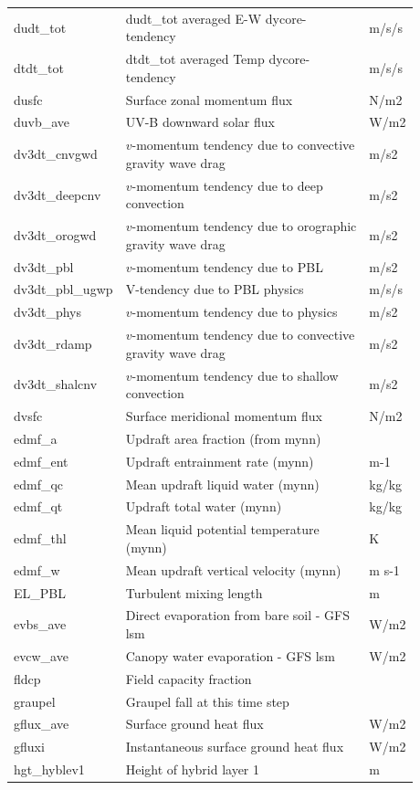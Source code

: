 \documentclass[11pt,fleqn]{report}              %
\begin{document}
\begin{enumerate}
\begin{enumerate}
{\begin{longtable}{p{0.17\linewidth} | p{0.6\linewidth} | p{0.11\linewidth} }
dudt\_tot & dudt\_tot averaged E-W dycore-tendency & m/s/s \\
dtdt\_tot & dtdt\_tot averaged Temp dycore-tendency & m/s/s \\ 
dusfc  & Surface zonal momentum flux & N/m2 \\
duvb\_ave  & UV-B downward solar flux & W/m2  \\
dv3dt\_cnvgwd & $v$-momentum tendency due to convective gravity wave drag & m/s2 \\
dv3dt\_deepcnv & $v$-momentum tendency due to deep convection & m/s2 \\
dv3dt\_orogwd & $v$-momentum tendency due to orographic gravity wave drag & m/s2 \\
dv3dt\_pbl & $v$-momentum tendency due to PBL & m/s2 \\
dv3dt\_pbl\_ugwp & V-tendency due to PBL physics & m/s/s \\
dv3dt\_phys & $v$-momentum tendency due to physics & m/s2 \\
dv3dt\_rdamp & $v$-momentum tendency due to convective gravity wave drag & m/s2 \\
dv3dt\_shalcnv & $v$-momentum tendency due to shallow convection & m/s2 \\
dvsfc  & Surface meridional momentum flux & N/m2  \\
edmf\_a & Updraft area fraction (from mynn) & \\
edmf\_ent & Updraft entrainment rate (mynn) & m-1 \\
edmf\_qc & Mean updraft liquid water (mynn) & kg/kg \\
edmf\_qt & Updraft total water (mynn) & kg/kg \\
edmf\_thl & Mean liquid potential temperature (mynn) & K \\
edmf\_w & Mean updraft vertical velocity (mynn) & m s-1 \\
EL\_PBL & Turbulent mixing length & m \\
evbs\_ave & Direct evaporation from bare soil - GFS lsm & W/m2  \\
evcw\_ave  & Canopy water evaporation - GFS lsm & W/m2 \\
fldcp  & Field capacity fraction  & \\
graupel & Graupel fall at this time step & \\
gflux\_ave  & Surface ground heat flux & W/m2  \\
gfluxi  & Instantaneous surface ground heat flux & W/m2  \\
hgt\_hyblev1  & Height of hybrid layer 1 & m  \\

\end{longtable}}
\end{enumerate}
\end{enumerate}
\end{document}
